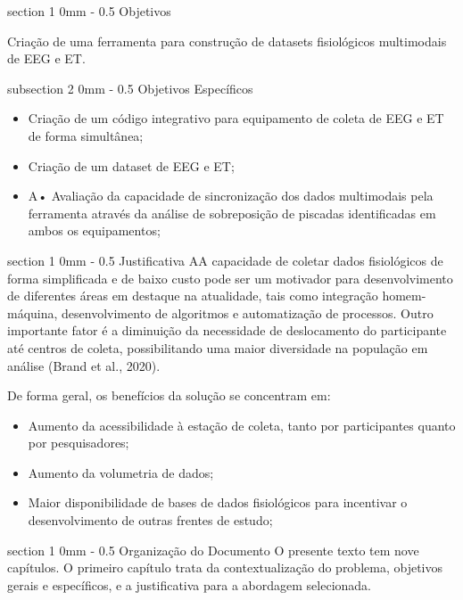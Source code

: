 \documentclass[a4paper, 12pt]{ppgeb}
\makeatletter
\renewcommand{\section}{\@startsection
{section}
{1}
{0mm}
{-\baselineskip}
{0.5\baselineskip}
{\large\bfseries\scshape}}
\renewcommand{\subsection}{\@startsection
{subsection}
{2}
{0mm}
{-\baselineskip}
{0.5\baselineskip}
{\bf\sffamily}}
\makeatother
\begin{document}
\section{Objetivos}

Criação de uma ferramenta para construção de datasets fisiológicos multimodais de EEG e ET.

\subsection{Objetivos Específicos}

\begin{itemize}
    \item Criação de um código integrativo para equipamento de coleta de EEG e ET de forma simultânea;
    \item Criação de um dataset de EEG e ET;
    \item A•	Avaliação da capacidade de sincronização dos dados multimodais pela ferramenta através da análise de sobreposição de piscadas identificadas em ambos os equipamentos;

\end{itemize}


\section{Justificativa}
AA capacidade de coletar dados fisiológicos de forma simplificada e de baixo custo pode ser um motivador para desenvolvimento de diferentes áreas em destaque na atualidade, tais como integração homem-máquina, desenvolvimento de algoritmos e automatização de processos. Outro importante fator é a diminuição da necessidade de deslocamento do participante até centros de coleta, possibilitando uma maior diversidade na população em análise (Brand et al., 2020). 

De forma geral, os benefícios da solução se concentram em:
\begin{itemize}
    \item Aumento da acessibilidade à estação de coleta, tanto por participantes quanto por pesquisadores;
    \item Aumento da volumetria de dados;
    \item Maior disponibilidade de bases de dados fisiológicos para incentivar o desenvolvimento de outras frentes de estudo;
\end{itemize}


\section{Organização do Documento}
O presente texto tem nove capítulos. 
O primeiro capítulo trata da contextualização do problema, 
objetivos gerais e específicos, e a justificativa para a abordagem selecionada. 
\end{document}
